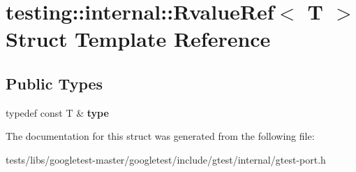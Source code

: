 \hypertarget{structtesting_1_1internal_1_1RvalueRef}{}\section{testing\+:\+:internal\+:\+:Rvalue\+Ref$<$ T $>$ Struct Template Reference}
\label{structtesting_1_1internal_1_1RvalueRef}
\subsection*{Public Types}
\begin{DoxyCompactItemize}
\item 
\mbox{\label{structtesting_1_1internal_1_1RvalueRef_ad09f1fbc87569c7e2837274193097e44}} 
typedef const T \& {\bfseries type}
\end{DoxyCompactItemize}


The documentation for this struct was generated from the following file\+:\begin{DoxyCompactItemize}
\item 
tests/libs/googletest-\/master/googletest/include/gtest/internal/gtest-\/port.\+h\end{DoxyCompactItemize}
